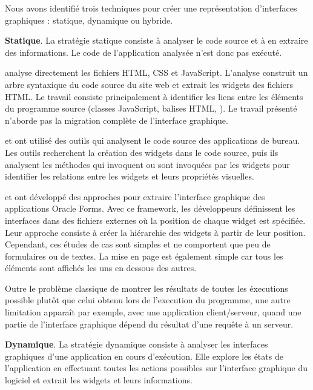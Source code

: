 \documentclass[a4paper]{article}
\begin{document}
Nous avons identifié trois techniques pour créer une représentation d'interfaces graphiques :
statique, dynamique ou hybride.

\textbf{Statique}. La stratégie statique consiste à analyser le code source et à en extraire des informations. 
Le code de l'application analysée n'est donc pas exécuté.

\citet{Clou16a} analyse directement les fichiers HTML, CSS et JavaScript.
L'analyse construit un arbre syntaxique du code source du site web 
  et extrait les widgets des fichiers HTML.
Le travail consiste principalement à identifier les liens entre les éléments du programme source (classes JavaScript, balises HTML, \etc). 
Le travail présenté n'aborde pas la migration complète de l'interface graphique.

\citet{Silv10a, Lell16a} et \citet{Stai07a} ont utilisé des outils qui analysent
  le code source des applications de bureau.
Les outils recherchent la création des widgets dans le code source,
  puis ils analysent les méthodes qui invoquent ou sont invoquées par les widgets pour
  identifier les relations entre les widgets et leurs propriétés visuelles.

\citet{Sanc14a} et \citet{Garce17b} ont développé des approches pour extraire l'interface graphique des applications Oracle Forms.
Avec ce framework, les développeurs définissent les interfaces dans des fichiers externes où la position de chaque widget est spécifiée.
Leur approche consiste à créer la hiérarchie des widgets à partir de leur position.
Cependant, ces études de cas sont simples et ne comportent que peu de formulaires ou de textes.
La mise en page est également simple car tous les éléments sont affichés les uns en dessous des autres.

Outre le problème classique de montrer les résultats de toutes les éxecutions possible plutôt 
  que celui obtenu lors de l'execution du programme, 
  une autre limitation apparaît par exemple, avec une application client/serveur, 
    quand une partie de l'interface graphique dépend du résultat d'une requête à un serveur.

\textbf{Dynamique}. La stratégie dynamique consiste à analyser les interfaces graphiques d'une application en cours d'exécution.
Elle explore les états de l'application en effectuant toutes les actions possibles sur l'interface graphique du logiciel
  et extrait les widgets et leurs informations.
\end{document}
